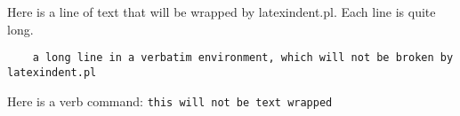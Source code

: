 Here is a line of
text that will be
wrapped by
latexindent.pl.
Each line is quite
long.

\begin{verbatim}
    a long line in a verbatim environment, which will not be broken by latexindent.pl
\end{verbatim}

Here is a verb
command:
\verb!this will not be text wrapped!
